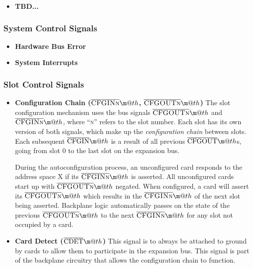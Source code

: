 \documentclass{article}
\makeatletter
\newcommand*{\textoverline}[1]{$\overline{\hbox{#1}}\m@th$}
\makeatother
\begin{document}
\begin{itemize}
	\item{\textbf{TBD...}}
\end{itemize}

\subsubsection{System Control Signals}

\begin{itemize}
	\item{\textbf{Hardware Bus Error}}

	\item{\textbf{System Interrupts}}
\end{itemize}

\subsubsection{Slot Control Signals}

\begin{itemize}

	\item{\textbf{Configuration Chain
	(\textoverline{\scshape CFGINn},
	\textoverline{\scshape CFGOUTn})}} The slot configuration mechanism uses
	the bus signals \textoverline{\scshape CFGOUTn} and
	\textoverline{\scshape CFGINn}, where ``\textsc{n}'' refers to the slot
	number. Each slot has its own version of both signals, which make up the
	\textit{configuration chain} between slots. Each subsequent
	\textoverline{CFGIN} is a result of all previous
	\textoverline{CFGOUT}s, going from slot 0 to the last slot on the
	expansion bus.

	During the autoconfiguration process, an unconfigured card responds to
	the address space X if its \textoverline{\scshape CFGINn} is asserted.
	All unconfigured cards start up with \textoverline{\scshape CFGOUTn}
	negated. When configured, a card will assert its
	\textoverline{\scshape CFGOUTn} which results in the
	\textoverline{\scshape CFGINn} of the next slot being asserted.
	Backplane logic automatically passes on the state of the previous
	\textoverline{\scshape CFGOUTn} to the next
	\textoverline{\scshape CFGINn} for any slot not occupied by a card.

	\item{\textbf{Card Detect (\textoverline{CDET})}} This signal is to
	always be attached to ground by cards to allow them to participate in
	the expansion bus. This signal is part of the backplane circuitry that
	allows the configuration chain to function.

\end{itemize}
\end{document}
